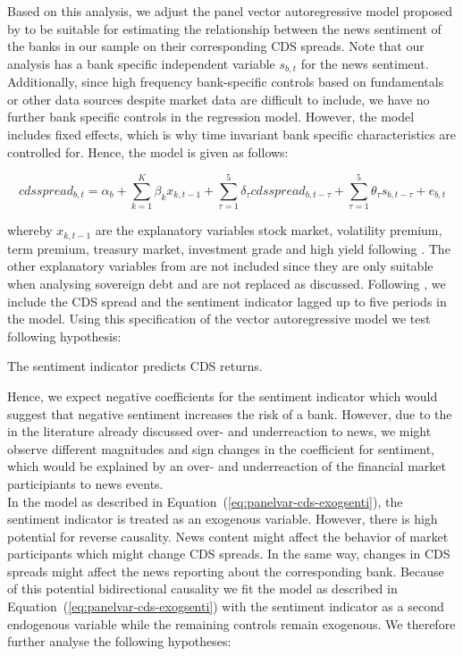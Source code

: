 Based on this analysis, we adjust the panel vector autoregressive model proposed by \cite{cathcart2020} to be suitable for estimating the relationship between the news sentiment of the banks in our sample on their corresponding CDS spreads. Note that our analysis has a bank specific independent variable $s_{b,t}$ for the news sentiment. Additionally, since high frequency bank-specific controls based on fundamentals or other data sources despite market data are difficult to include, we have no further bank specific controls in the regression model. However, the model includes fixed effects, which is why time invariant bank specific characteristics are controlled for. Hence, the model is given as follows:

\begin{equation} \label{eq:panelvar-cds-exogsenti}
	cdsspread_{b,t} = \alpha_b + \sum_{k=1}^K\beta_{k}x_{k,t-1} + \sum^5_{\tau=1} \delta_{\tau}cdsspread_{b,t-\tau} + \sum^5_{\tau=1}\theta_{\tau}s_{b,t-\tau} + e_{b,t}
\end{equation}

whereby $x_{k,t-1}$ are the explanatory variables stock market, volatility premium, term premium, treasury market, investment grade and high yield following \cite{cathcart2020}. The other explanatory variables from \cite{cathcart2020} are not included since they are only suitable when analysing sovereign debt and are not replaced as discussed. Following \cite{cathcart2020}, we include the CDS spread and the sentiment indicator lagged up to five periods in the model. Using this specification of the vector autoregressive model we test following hypothesis:

\begin{hyp}
	The sentiment indicator predicts CDS returns.
\end{hyp}

Hence, we expect negative coefficients for the sentiment indicator which would suggest that negative sentiment increases the risk of a bank. However, due to the in the literature already discussed over- and underreaction to news, we might observe different magnitudes and sign changes in the coefficient for sentiment, which would be explained by an over- and underreaction of the financial market participiants to news events. \\

In the model as described in \mbox{Equation~(\ref{eq:panelvar-cds-exogsenti})}, the sentiment indicator is treated as an exogenous variable. However, there is high potential for reverse causality. News content might affect the behavior of market participants which might change CDS spreads. In the same way, changes in CDS spreads might affect the news reporting about the corresponding bank. Because of this potential bidirectional causality we fit the model as described in \mbox{Equation~(\ref{eq:panelvar-cds-exogsenti})} with the sentiment indicator as a second endogenous variable while the remaining controls remain exogenous. We therefore further analyse the following hypotheses:

